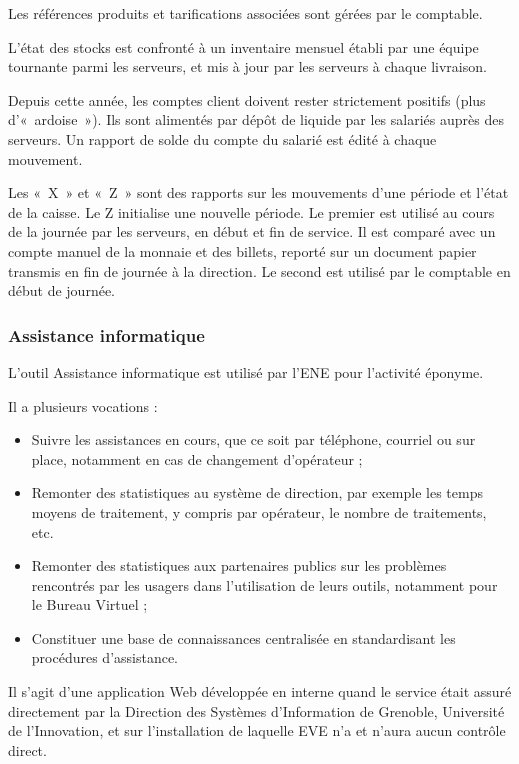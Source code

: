 Les références produits et tarifications associées sont gérées par le comptable.

L'état des stocks est confronté à un inventaire mensuel établi par une équipe
tournante parmi les serveurs, et mis à jour par les serveurs à chaque
livraison.

Depuis cette année, les comptes client doivent rester strictement positifs
(plus d'«~ardoise~»).
Ils sont alimentés par dépôt de liquide par les salariés auprès des serveurs.
Un rapport de solde du compte du salarié est édité à chaque mouvement.

Les «~X~» et «~Z~» sont des rapports sur les mouvements d'une période et
l'état de la caisse. Le Z initialise une nouvelle période.
Le premier est utilisé au cours de la journée par les serveurs, en début et fin
de service. Il est comparé avec un compte manuel de la monnaie et des billets,
reporté sur un document papier transmis en fin de journée à la direction.
Le second est utilisé par le comptable en début de journée.

\subsubsection{Assistance informatique}

L'outil Assistance informatique est utilisé par l'ENE pour l'activité éponyme.

Il a plusieurs vocations :
\begin{itemize}
\item Suivre les assistances en cours, que ce soit par téléphone,
      courriel ou sur place, notamment en cas de changement d'opérateur ;
\item Remonter des statistiques au système de direction, par exemple les temps
      moyens de traitement, y compris par opérateur, le nombre de traitements,
      etc.
\item Remonter des statistiques aux partenaires publics sur les problèmes
      rencontrés par les usagers dans l'utilisation de leurs outils, notamment
      pour le Bureau Virtuel ;
\item Constituer une base de connaissances centralisée en standardisant les
      procédures d'assistance.
\end{itemize}

Il s'agit d'une application Web développée en interne quand le service était
assuré directement par la Direction des Systèmes d'Information de Grenoble,
Université de l'Innovation, et sur l'installation de laquelle EVE n'a et
n'aura aucun contrôle direct.

